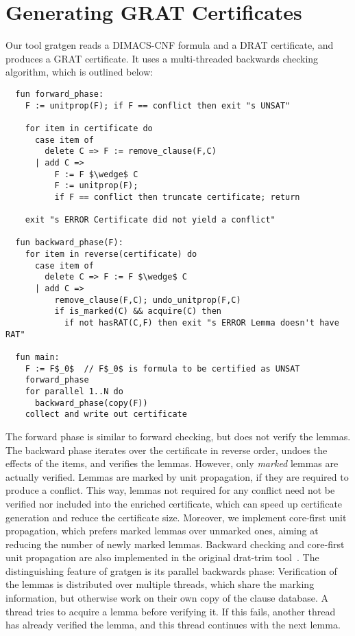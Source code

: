 \documentclass{llncs}
\begin{document}

\section{Generating GRAT Certificates}  
Our tool gratgen reads a DIMACS-CNF formula and a DRAT certificate, and produces a GRAT certificate. 
It uses a multi-threaded backwards checking algorithm, which is outlined below:
\begin{lstlisting}
  fun forward_phase:
    F := unitprop(F); if F == conflict then exit "s UNSAT"
    
    for item in certificate do
      case item of
        delete C => F := remove_clause(F,C)
      | add C =>  
          F := F $\wedge$ C
          F := unitprop(F); 
          if F == conflict then truncate certificate; return
          
    exit "s ERROR Certificate did not yield a conflict"

  fun backward_phase(F):
    for item in reverse(certificate) do
      case item of 
        delete C => F := F $\wedge$ C
      | add C =>
          remove_clause(F,C); undo_unitprop(F,C)
          if is_marked(C) && acquire(C) then
            if not hasRAT(C,F) then exit "s ERROR Lemma doesn't have RAT"
          
  fun main:
    F := F$_0$  // F$_0$ is formula to be certified as UNSAT
    forward_phase
    for parallel 1..N do
      backward_phase(copy(F))
    collect and write out certificate  
\end{lstlisting}
The forward phase is similar to forward checking, but does not verify the lemmas.
The backward phase iterates over the certificate in reverse order, undoes the effects of the items, and verifies the lemmas.
However, only \emph{marked} lemmas are actually verified. Lemmas are marked by unit propagation, if they are required to produce a conflict.
This way, lemmas not required for any conflict need not be verified nor included into the enriched certificate, which can speed up certificate generation and reduce the certificate size.
Moreover, we implement core-first unit propagation, which prefers marked lemmas over unmarked ones, aiming at reducing the number of newly marked lemmas.
Backward checking and core-first unit propagation are also implemented in the original drat-trim tool~\cite{WHH14}. 
The distinguishing feature of gratgen is its parallel backwards phase: Verification of the lemmas is distributed over multiple threads, which share the marking information, but 
otherwise work on their own copy of the clause database. A thread tries to acquire a lemma before verifying it. If this fails, another thread has already verified the lemma, and 
this thread continues with the next lemma.
\end{document}
